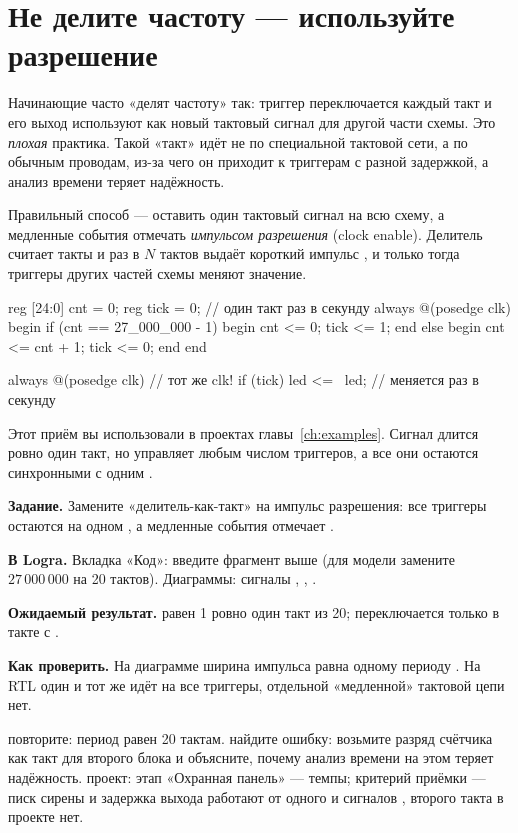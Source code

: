 \section{Не делите частоту --- используйте разрешение}

Начинающие часто «делят частоту» так: триггер переключается каждый
такт и его выход используют как новый тактовый сигнал для другой части схемы.
Это \emph{плохая} практика. Такой «такт» идёт не по специальной тактовой
сети, а по обычным проводам, из-за чего он приходит к триггерам с
разной задержкой, а анализ времени теряет надёжность.

Правильный способ --- оставить один тактовый сигнал на всю схему, а медленные
события отмечать \emph{импульсом разрешения} (clock enable). Делитель
считает такты и раз в $N$ тактов выдаёт короткий импульс , и только
тогда триггеры других частей схемы меняют значение.

\begin{vcode}
reg [24:0] cnt = 0;
reg        tick = 0;                      // один такт раз в секунду
always @(posedge clk) begin
    if (cnt == 27_000_000 - 1) begin
        cnt  <= 0;
        tick <= 1;
    end else begin
        cnt  <= cnt + 1;
        tick <= 0;
    end
end

always @(posedge clk)                      // тот же clk!
    if (tick) led <= ~led;                 // меняется раз в секунду
\end{vcode}

Этот приём вы использовали в проектах главы~\ref{ch:examples}. Сигнал
 длится ровно один такт, но управляет любым числом триггеров, а все
они остаются синхронными с одним .

\begin{diybox}
\textbf{Задание.} Замените «делитель-как-такт» на импульс разрешения: все триггеры остаются на одном , а медленные события отмечает .

\textbf{В Logra.} Вкладка «Код»: введите фрагмент выше (для модели замените $27\,000\,000$ на 20 тактов). Диаграммы: сигналы , , .

\textbf{Ожидаемый результат.}  равен 1 ровно один такт из 20;  переключается только в такте с .

\textbf{Как проверить.} На диаграмме ширина импульса  равна одному периоду . На RTL один и тот же  идёт на все триггеры, отдельной «медленной» тактовой цепи нет.

 повторите: период  равен 20 тактам.  найдите ошибку: возьмите разряд счётчика как такт для второго блока и объясните, почему анализ времени на этом теряет надёжность.  проект: этап «Охранная панель» --- темпы; критерий приёмки --- писк сирены и задержка выхода работают от одного  и сигналов , второго такта в проекте нет.
\end{diybox}

